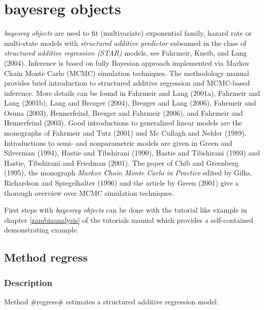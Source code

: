 \chapter{bayesreg objects}
\label{bayesreg} 

{\em bayesreg objects} are used to fit (multivariate) exponential
family, hazard rate or multi-state models with {\em structured
additive predictor} subsumed in the class of {\em structured
additive regression (STAR)} models, see Fahrmeir, Kneib, and Lang
(2004). Inference is based on fully Bayesian approach implemented
via Markov Chain Monte Carlo (MCMC) simulation techniques. The
methodology manual provides brief introduction to structured
additive regression and MCMC-based inference. More details can be
found in Fahrmeir and Lang (2001a), Fahrmeir and Lang (2001b),
Lang and Brezger (2004), Brezger and Lang (2006), Fahrmeir and
Osuna (2003), Hennerfeind, Brezger and Fahrmeir (2006), and
Fahrmeir and Hennerfeind (2003). Good introductions to generalized
linear models are the monographs of Fahrmeir and Tutz (2001) and
Mc Cullagh and Nelder (1989). Introductions to semi- and
nonparametric models are given in Green and Silverman (1994),
Hastie and Tibshirani (1990), Hastie and Tibshirani (1993) and
Hastie, Tibshirani and Friedman (2001). The paper of Chib and
Greenberg (1995), the monograph {\em Markov Chain Monte Carlo in
Practice} edited by Gilks, Richardson and Spiegelhalter (1996) and
the article by Green (2001) give a thorough overview over MCMC
simulation techniques.

First steps with {\em bayesreg objects} can be done with the
tutorial like example in chapter \ref*{zambiaanalysis} of the
tutorials manual which provides a self-contained demonstrating
example.

\clearpage

\section{Method regress}
\label{bayesregress} 

\subsection{Description}
\label{bayesregregressdescr}

Method #regress# estimates a structured additive regression model.

     

